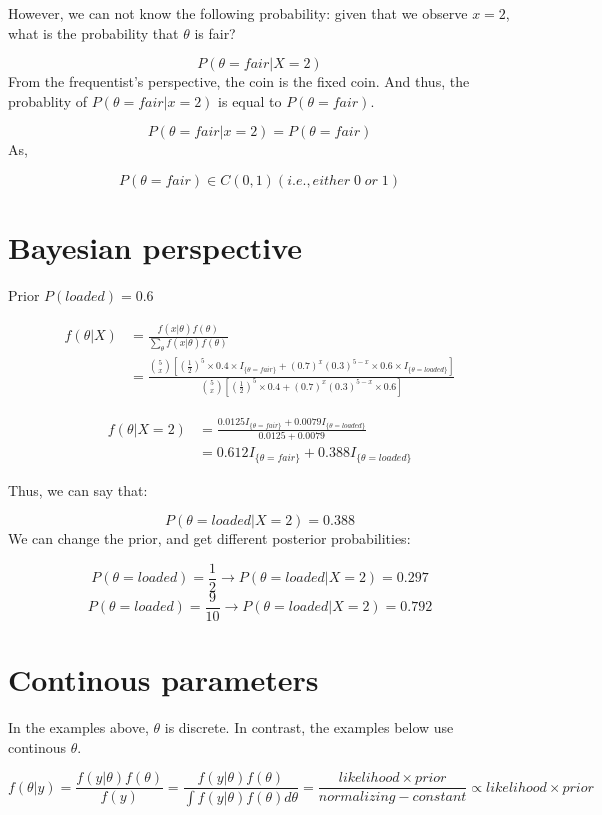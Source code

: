 \documentclass[]{book}
\begin{document}
However, we can not know the following probability: given that we
observe \(x=2\), what is the probability that \(\theta\) is fair?

\[P(\theta=fair | X=2)\] From the frequentist's perspective, the coin is
the fixed coin. And thus, the probablity of \(P(\theta=fair|x=2)\) is
equal to \(P(\theta=fair)\).

\[P(\theta=fair|x=2)=P(\theta=fair)\] As,

\[P(\theta=fair) \in C(0,1) (i.e., either \; 0 \; or \; 1)\]

\section{Bayesian perspective}\label{bayesian-perspective}

Prior \(P(loaded)=0.6\)

\[\begin{aligned} f(\theta | X) &= \frac{f(x|\theta) f(\theta)}{\sum_{\theta} f(x|\theta)f(\theta)} \\ &=\frac{\binom{5}{x} [(\frac{1}{2})^5 \times 0.4 \times I_{\{\theta=fair \}}+ (0.7)^x(0.3)^{5-x} \times 0.6 \times I_{\{\theta=loaded \}}]}{\binom{5}{x} [(\frac{1}{2})^5 \times 0.4 + (0.7)^x(0.3)^{5-x} \times 0.6]}  \end{aligned}\]

\[\begin{aligned} f(\theta |X=2) &=\frac{0.0125 I_{\{\theta=fair \}}+0.0079 I_{\{\theta=loaded \}} }{0.0125+0.0079} \\ &= 0.612 I_{\{\theta=fair \}} + 0.388 I_{\{\theta=loaded \}} \end{aligned}\]

Thus, we can say that:

\[P(\theta=loaded | X=2)=0.388\] We can change the prior, and get
different posterior probabilities:

\[P(\theta=loaded)=\frac{1}{2} \rightarrow P(\theta=loaded | X=2)=0.297\]
\[P(\theta=loaded)=\frac{9}{10} \rightarrow P(\theta=loaded | X=2)=0.792\]

\section{Continous parameters}\label{continous-parameters}

In the examples above, \(\theta\) is discrete. In contrast, the examples
below use continous \(\theta\).

\[f(\theta |y)=\frac{f(y|\theta) f(\theta)}{f(y)}=\frac{f(y|\theta) f(\theta)}{\int f(y|\theta)f(\theta)d\theta}=\frac{likelihood \times prior}{normalizing-constant} \propto likelihood \times prior\]
\end{document}
